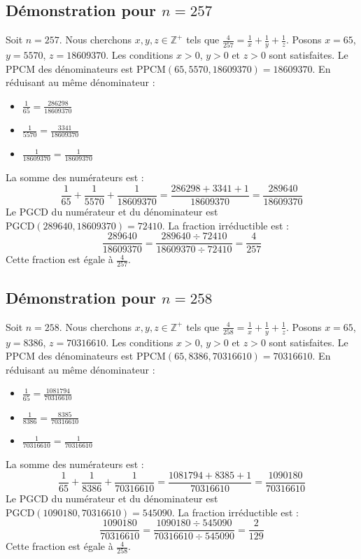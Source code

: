 \documentclass[11pt,a4paper]{article}
\begin{document}
\subsection{Démonstration pour $n = 257$}
Soit $n = 257$. Nous cherchons $x, y, z \in \mathbb{Z}^{+}$ tels que $\frac{4}{257} = \frac{1}{x} + \frac{1}{y} + \frac{1}{z}$.
Posons $x = 65$, $y = 5570$, $z = 18609370$.
Les conditions $x > 0$, $y > 0$ et $z > 0$ sont satisfaites.
Le PPCM des dénominateurs est $\text{PPCM}(65, 5570, 18609370) = 18609370$.
En réduisant au même dénominateur :
\begin{itemize}
    \item $\frac{1}{65} = \frac{286298}{18609370}$
    \item $\frac{1}{5570} = \frac{3341}{18609370}$
    \item $\frac{1}{18609370} = \frac{1}{18609370}$
\end{itemize}
La somme des numérateurs est :
$$ \frac{1}{65} + \frac{1}{5570} + \frac{1}{18609370} = \frac{286298 + 3341 + 1}{18609370} = \frac{289640}{18609370} $$
Le PGCD du numérateur et du dénominateur est $\text{PGCD}(289640, 18609370) = 72410$.
La fraction irréductible est :
$$ \frac{289640}{18609370} = \frac{289640 \div 72410}{18609370 \div 72410} = \frac{4}{257} $$
Cette fraction est égale à $\frac{4}{257}$.

\subsection{Démonstration pour $n = 258$}
Soit $n = 258$. Nous cherchons $x, y, z \in \mathbb{Z}^{+}$ tels que $\frac{4}{258} = \frac{1}{x} + \frac{1}{y} + \frac{1}{z}$.
Posons $x = 65$, $y = 8386$, $z = 70316610$.
Les conditions $x > 0$, $y > 0$ et $z > 0$ sont satisfaites.
Le PPCM des dénominateurs est $\text{PPCM}(65, 8386, 70316610) = 70316610$.
En réduisant au même dénominateur :
\begin{itemize}
    \item $\frac{1}{65} = \frac{1081794}{70316610}$
    \item $\frac{1}{8386} = \frac{8385}{70316610}$
    \item $\frac{1}{70316610} = \frac{1}{70316610}$
\end{itemize}
La somme des numérateurs est :
$$ \frac{1}{65} + \frac{1}{8386} + \frac{1}{70316610} = \frac{1081794 + 8385 + 1}{70316610} = \frac{1090180}{70316610} $$
Le PGCD du numérateur et du dénominateur est $\text{PGCD}(1090180, 70316610) = 545090$.
La fraction irréductible est :
$$ \frac{1090180}{70316610} = \frac{1090180 \div 545090}{70316610 \div 545090} = \frac{2}{129} $$
Cette fraction est égale à $\frac{4}{258}$.
\end{document}

